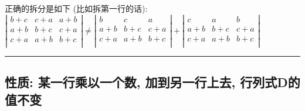 \documentclass[UTF8]{ctexart}
\begin{document}
	
	正确的拆分是如下 (比如拆第一行的话): \\	
	$
	\left| \begin{matrix}
		b+c&		c+a&		a+b\\
		a+b&		b+c&		c+a\\
		c+a&		a+b&		b+c\\
	\end{matrix} \right|\ne \left| \begin{matrix}
		b&		c&		a\\
		a+b&		b+c&		c+a\\
		c+a&		a+b&		b+c\\
	\end{matrix} \right|+\left| \begin{matrix}
		c&		a&		b\\
		a+b&		b+c&		c+a\\
		c+a&		a+b&		b+c\\
	\end{matrix} \right|
	$ \\
	
	\hrule
	
	\subsection{  性质:  某一行乘以一个数, 加到另一行上去, 行列式D的值不变}
	
\end{document}
